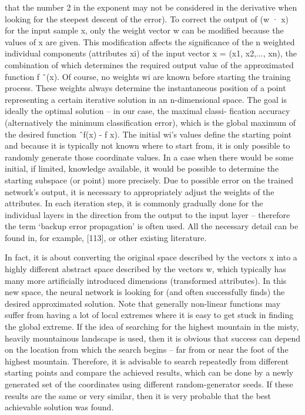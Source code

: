 \documentclass[11pt,openany,executivepaper]{book}
\begin{document}
that the number 2 in the exponent may not be considered in the derivative when
looking for the steepest descent of the error).
To correct the output of (w · x) for the input sample x, only the weight
vector w can be modified because the values of x are given. This modification
affects the significance of the n weighted individual components (attributes xi)
of the input vector x = (x1, x2,..., xn), the combination of which determines the
required output value of the approximated function f
ˆ(x).
Of course, no weights wi are known before starting the training process.
These weights always determine the instantaneous position of a point representing a certain iterative solution in an n-dimensional space.
The goal is ideally the optimal solution – in our case, the maximal classi-
fication accuracy (alternatively the minimum classification error), which is the
global maximum of the desired function ˆf(x) - f x).
The initial wi’s values define the starting point and because it is typically not
known where to start from, it is only possible to randomly generate those coordinate values. In a case when there would be some initial, if limited, knowledge
available, it would be possible to determine the starting subspace (or point) more
precisely.
Due to possible error on the trained network’s output, it is necessary to appropriately adjust the weights of the attributes. In each iteration step, it is commonly
gradually done for the individual layers in the direction from the output to the
input layer – therefore the term ‘backup error propagation’ is often used. All the
necessary detail can be found in, for example, [113], or other existing literature.

In fact, it is about converting the original space described by the vectors x into
a highly different abstract space described by the vectors w, which typically has
many more artificially introduced dimensions (transformed attributes). In this
new space, the neural network is looking for (and often successfully finds) the
desired approximated solution.
Note that generally non-linear functions may suffer from having a lot of local
extremes where it is easy to get stuck in finding the global extreme. If the idea of
searching for the highest mountain in the misty, heavily mountainous landscape
is used, then it is obvious that success can depend on the location from which the
search begins – far from or near the foot of the highest mountain.
Therefore, it is advisable to search repeatedly from different starting points
and compare the achieved results, which can be done by a newly generated set
of the coordinates using different random-generator seeds.
If these results are the same or very similar, then it is very probable that the
best achievable solution was found.
\end{document}

